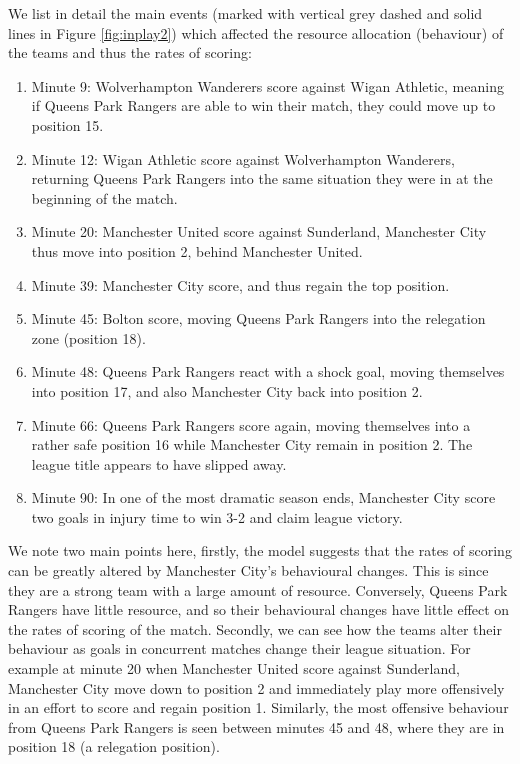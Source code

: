 We list in detail the main events (marked with vertical grey dashed and solid lines in Figure \ref{fig:inplay2}) which
affected the resource allocation (behaviour) of the teams and thus the rates of scoring:
\begin{enumerate}
  \item Minute 9: Wolverhampton Wanderers score against Wigan Athletic, meaning if Queens Park Rangers are able to win
  their match, they could move up to position 15.
  \item Minute 12: Wigan Athletic score against Wolverhampton Wanderers, returning Queens Park Rangers into the
  same situation they were in at the beginning of the match.
  \item Minute 20: Manchester United score against Sunderland, Manchester City thus move into position 2, behind
  Manchester United.
  \item Minute 39: Manchester City score, and thus regain the top position.
  \item Minute 45: Bolton score, moving Queens Park Rangers into the relegation zone (position 18).
  \item Minute 48: Queens Park Rangers react with a shock goal, moving themselves into position 17, and also Manchester
  City back into position 2.
  \item Minute 66: Queens Park Rangers score again, moving themselves into a rather safe position 16 while Manchester
  City remain in position 2. The league title appears to have slipped away.
  \item Minute 90: In one of the most dramatic season ends, Manchester City score two goals in injury time to win 3-2
  and claim league victory.
\end{enumerate}

We note two main points here, firstly, the model suggests that the rates of scoring can be greatly altered by Manchester
City's behavioural changes. This is since they are a strong team with a large amount of resource. Conversely, Queens
Park Rangers have little resource, and so their behavioural changes have little effect on the rates of scoring of the
match. Secondly, we can see how the teams alter their behaviour as goals in concurrent matches change their league
situation. For example at minute 20 when Manchester United score against Sunderland, Manchester City move down to
position 2 and immediately play more offensively in an effort to score and regain position 1. Similarly, the most
offensive behaviour from Queens Park Rangers is seen between minutes 45 and 48, where they are in position 18 (a
relegation position).

